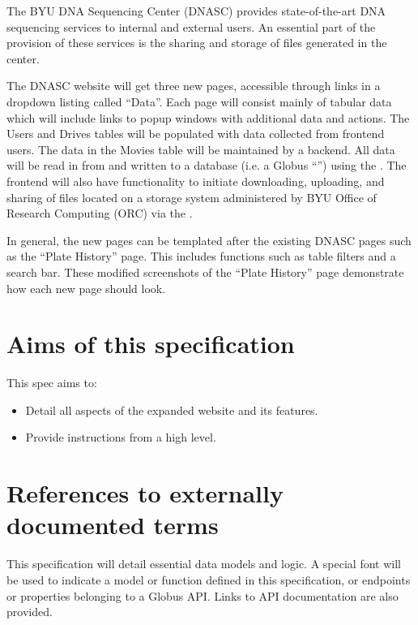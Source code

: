 
The BYU DNA Sequencing Center (DNASC) provides state-of-the-art DNA sequencing services to internal and external 
users. An essential part of the provision of these services is the sharing and storage of files generated in the 
center.

The DNASC website  will get three new pages, accessible 
through links in a dropdown listing called ``Data''. Each page will consist mainly of 
tabular data which will include links to popup windows with additional data and actions. 
The Users and Drives tables will be populated with data collected from frontend users. 
The data in the Movies table will be maintained by a backend. All data will be read in 
from and written to a database (i.e. a Globus ``'') using the 
. The frontend will also have functionality 
to initiate downloading, uploading, and sharing of files located on a storage system 
administered by BYU Office of Research Computing (ORC) via the .

In general, the new pages can be templated after the existing DNASC pages such as the ``Plate History'' page. This 
includes functions such as table filters and a search bar. 
These modified screenshots of the ``Plate History'' page 
demonstrate how each new page should look.

\section{Aims of this specification}

This spec aims to:

\begin{itemize}
  \item Detail all aspects of the expanded website and its features.
  \item Provide instructions from a high level.
\end{itemize}

\section{References to externally documented terms}

This specification will detail essential data models and logic. A special font will be used to indicate a model 
or function defined in this specification, or endpoints or properties belonging to a Globus API. Links to API 
documentation are also provided.

